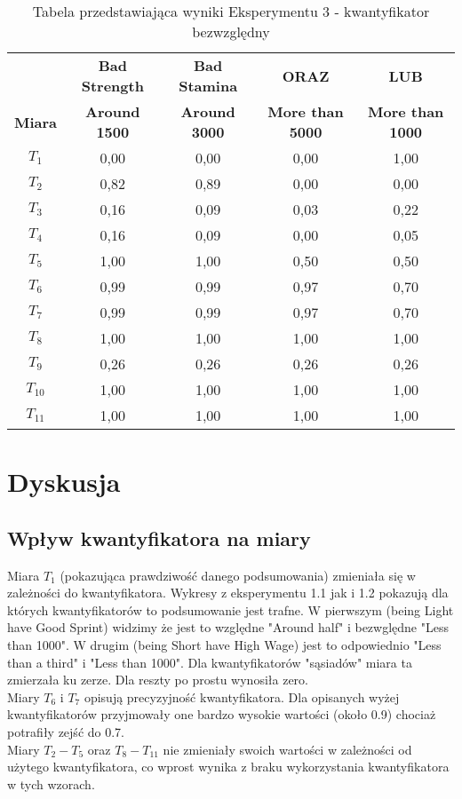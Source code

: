 \documentclass{classrep}
\begin{document}
\begin{table}[H]
	\centering
	\begin{tabular}{c c c c c } 
		\hline
		& \textbf{Bad Strength} & \textbf{Bad Stamina} & \textbf{ORAZ} & \textbf{LUB}\\ [0.5ex] 
		\textbf{Miara} & \textbf{Around 1500} & \textbf{Around 3000} & \textbf{More than 5000} & \textbf{More than 1000}\\ [0.5ex] 
		\hline
		\hline 
            $T_1$ & 0,00 & 0,00 & 0,00 & 1,00\\
            $T_2$ & 0,82 & 0,89 & 0,00 & 0,00\\
            $T_3$ & 0,16 & 0,09 & 0,03 & 0,22\\
            $T_4$ & 0,16 & 0,09 & 0,00 & 0,05\\
            $T_5$ & 1,00 & 1,00 & 0,50 & 0,50\\
            $T_6$ & 0,99 & 0,99 & 0,97 & 0,70\\
            $T_7$ & 0,99 & 0,99 & 0,97 & 0,70\\
            $T_8$ & 1,00 & 1,00 & 1,00 & 1,00\\
            $T_9$ & 0,26 & 0,26 & 0,26 & 0,26\\
            $T_{10}$ & 1,00 & 1,00 & 1,00 & 1,00\\
            $T_{11}$ & 1,00 & 1,00 & 1,00 & 1,00\\
		\hline
	\end{tabular}
	\caption{Tabela przedstawiająca wyniki Eksperymentu 3 - kwantyfikator bezwzględny}
\end{table}

\section{Dyskusja}

\subsection{Wpływ kwantyfikatora na miary}
Miara $T_1$ (pokazująca prawdziwość danego podsumowania) zmieniała się w zależności do kwantyfikatora. Wykresy z eksperymentu 1.1 jak i 1.2 pokazują dla których kwantyfikatorów to podsumowanie jest trafne. W pierwszym (being Light have Good Sprint) widzimy że jest to względne "Around half" i bezwględne "Less than 1000". W drugim (being Short have High Wage) jest to odpowiednio "Less than a third" i "Less than 1000". Dla kwantyfikatorów "sąsiadów" miara ta zmierzała ku zerze. Dla reszty po prostu wynosiła zero.\\
\newline
Miary $T_6$ i $T_7$ opisują precyzyjność kwantyfikatora. Dla opisanych wyżej kwantyfikatorów przyjmowały one bardzo wysokie wartości (około 0.9) chociaż potrafiły zejść do 0.7.\\
\newline
Miary $T_2-T_5$ oraz $T_8-T_{11}$ nie zmieniały swoich wartości w zależności od użytego kwantyfikatora, co wprost wynika z braku wykorzystania kwantyfikatora w tych wzorach. 
\end{document}
